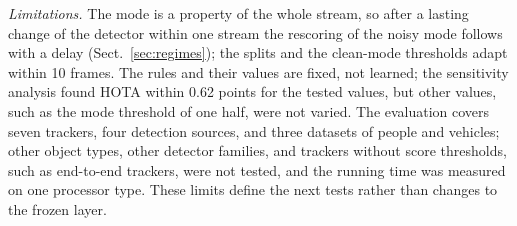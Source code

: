 \emph{Limitations.} The mode is a property of the whole stream, so after a lasting change of the
detector within one stream the rescoring of the noisy mode follows with a delay
(Sect.~\ref{sec:regimes}); the splits and the clean-mode thresholds adapt within 10 frames. The
rules and their values are fixed, not learned; the sensitivity analysis found HOTA within 0.62
points for the tested values, but other values, such as the mode threshold of one half, were not
varied. The evaluation covers seven trackers, four detection sources, and three datasets of people
and vehicles; other object types, other detector families, and trackers without score thresholds,
such as end-to-end trackers, were not tested, and the running time was measured on one processor
type. These limits define the next tests rather than changes to the frozen layer.
